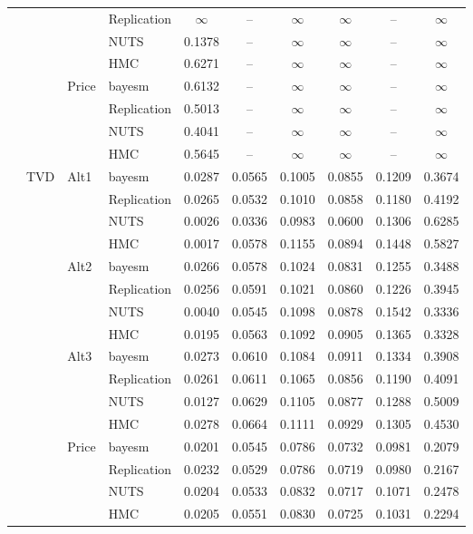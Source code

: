 \begin{longtable}{clllcccccc}
 &  &  & Replication & $\infty$ & {--} & $\infty$ & $\infty$ & {--} & $\infty$ \\
 &  &  & NUTS & 0.1378 & {--} & $\infty$ & $\infty$ & {--} & $\infty$ \\
 &  &  & HMC & 0.6271 & {--} & $\infty$ & $\infty$ & {--} & $\infty$ \\
 &  & Price & bayesm & 0.6132 & {--} & $\infty$ & $\infty$ & {--} & $\infty$ \\
 &  &  & Replication & 0.5013 & {--} & $\infty$ & $\infty$ & {--} & $\infty$ \\
 &  &  & NUTS & 0.4041 & {--} & $\infty$ & $\infty$ & {--} & $\infty$ \\
 &  &  & HMC & 0.5645 & {--} & $\infty$ & $\infty$ & {--} & $\infty$ \\
 & TVD & Alt1 & bayesm & 0.0287 & 0.0565 & 0.1005 & 0.0855 & 0.1209 & 0.3674 \\
 &  &  & Replication & 0.0265 & 0.0532 & 0.1010 & 0.0858 & 0.1180 & 0.4192 \\
 &  &  & NUTS & 0.0026 & 0.0336 & 0.0983 & 0.0600 & 0.1306 & 0.6285 \\
 &  &  & HMC & 0.0017 & 0.0578 & 0.1155 & 0.0894 & 0.1448 & 0.5827 \\
 &  & Alt2 & bayesm & 0.0266 & 0.0578 & 0.1024 & 0.0831 & 0.1255 & 0.3488 \\
 &  &  & Replication & 0.0256 & 0.0591 & 0.1021 & 0.0860 & 0.1226 & 0.3945 \\
 &  &  & NUTS & 0.0040 & 0.0545 & 0.1098 & 0.0878 & 0.1542 & 0.3336 \\
 &  &  & HMC & 0.0195 & 0.0563 & 0.1092 & 0.0905 & 0.1365 & 0.3328 \\
 &  & Alt3 & bayesm & 0.0273 & 0.0610 & 0.1084 & 0.0911 & 0.1334 & 0.3908 \\
 &  &  & Replication & 0.0261 & 0.0611 & 0.1065 & 0.0856 & 0.1190 & 0.4091 \\
 &  &  & NUTS & 0.0127 & 0.0629 & 0.1105 & 0.0877 & 0.1288 & 0.5009 \\
 &  &  & HMC & 0.0278 & 0.0664 & 0.1111 & 0.0929 & 0.1305 & 0.4530 \\
 &  & Price & bayesm & 0.0201 & 0.0545 & 0.0786 & 0.0732 & 0.0981 & 0.2079 \\
 &  &  & Replication & 0.0232 & 0.0529 & 0.0786 & 0.0719 & 0.0980 & 0.2167 \\
 &  &  & NUTS & 0.0204 & 0.0533 & 0.0832 & 0.0717 & 0.1071 & 0.2478 \\
 &  &  & HMC & 0.0205 & 0.0551 & 0.0830 & 0.0725 & 0.1031 & 0.2294 \\

\end{longtable}
